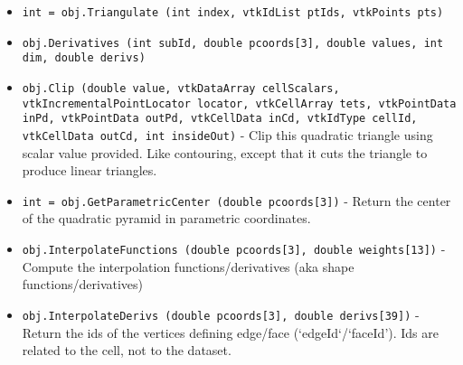\begin{itemize}
\item  \verb|int = obj.Triangulate (int index, vtkIdList ptIds, vtkPoints pts)|

\item  \verb|obj.Derivatives (int subId, double pcoords[3], double values, int dim, double derivs)|

\item  \verb|obj.Clip (double value, vtkDataArray cellScalars, vtkIncrementalPointLocator locator, vtkCellArray tets, vtkPointData inPd, vtkPointData outPd, vtkCellData inCd, vtkIdType cellId, vtkCellData outCd, int insideOut)| -  Clip this quadratic triangle using scalar value provided. Like
 contouring, except that it cuts the triangle to produce linear
 triangles.

\item  \verb|int = obj.GetParametricCenter (double pcoords[3])| -  Return the center of the quadratic pyramid in parametric coordinates.

\item  \verb|obj.InterpolateFunctions (double pcoords[3], double weights[13])| -  Compute the interpolation functions/derivatives
 (aka shape functions/derivatives)

\item  \verb|obj.InterpolateDerivs (double pcoords[3], double derivs[39])| -  Return the ids of the vertices defining edge/face (`edgeId`/`faceId').
 Ids are related to the cell, not to the dataset.

\end{itemize}
